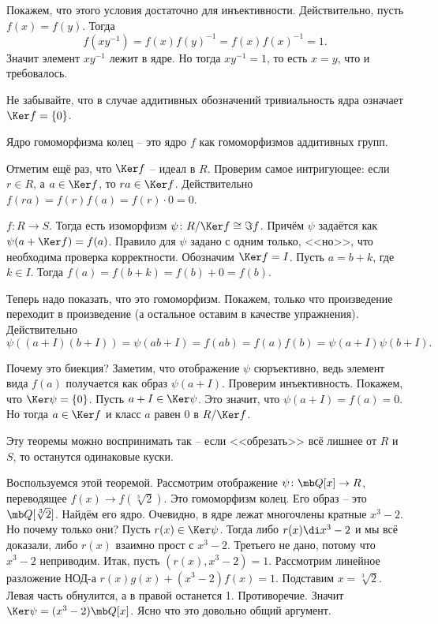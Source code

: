 Покажем, что этого условия достаточно для инъективности. Действительно, пусть $f(x)=f(y)$. Тогда $$f(xy^{-1})=f(x)f(y)^{-1}=f(x)f(x)^{-1}=1.$$
Значит элемент $xy^{-1}$ лежит в ядре. Но тогда $xy^{-1}=1$, то есть $x=y$, что и требовалось.
\endproof

\rm Не забывайте, что в случае аддитивных обозначений тривиальность ядра означает $\Ker f=\{0\}$.
\erm

\rm Ядро гомоморфизма колец -- это ядро $f$ как гомоморфизмов аддитивных групп.
\erm

\rm Отметим ещё раз, что $\Ker f$ -- идеал в $R$. Проверим самое интригующее: если $r\in R$, а $a\in \Ker f$, то $ra \in \Ker f$. Действительно $f(ra)=f(r)f(a)=f(r)\cdot 0=0$.
\erm 



 $f\colon R \to S$. Тогда есть изоморфизм $\psi \colon R/\Ker f \cong \Im f$. Причём $\psi$ задаётся как $\psi(a+\Ker f)=f(a)$. 
\ethrm
\proof Правило для $\psi$ задано с одним только, <<но>>, что необходима проверка корректности. Обозначим $\Ker f=I$. Пусть $a=b+k$, где $k\in I$. Тогда $f(a)=f(b+k)=f(b)+0=f(b)$.

Теперь надо показать, что это гомоморфизм. Покажем, только что произведение переходит в произведение (а остальное оставим в качестве упражнения). Действительно
$$\psi((a+I)(b+I))=\psi(ab+I)= f(ab)=f(a)f(b)=\psi(a+I)\psi(b+I).$$

Почему это биекция? Заметим, что отображение $\psi$ сюръективно, ведь элемент вида $f(a)$ получается как образ $\psi(a+I)$. Проверим инъективность. Покажем, что $\Ker \psi =\{0\}$. 
Пусть $a+I\in \Ker \psi$. Это значит, что $\psi(a+I)=f(a)=0$. Но тогда $a\in \Ker f$ и класс $a$ равен $0$ в $R/\Ker f$. 
\endproof

Эту теоремы можно воспринимать так -- если <<обрезать>> всё лишнее от $R$ и $S$, то останутся одинаковые куски.  

Воспользуемся этой теоремой. Рассмотрим отображение $\psi \colon \mb Q[x] \to R$, переводящее $f(x) \to f(\sqrt[3]{2})$. Это гомоморфизм колец. Его образ -- это $\mb Q[\sqrt[3]{2}]$. Найдём его ядро. Очевидно, в ядре лежат многочлены кратные $x^3-2$. Но почему только они? Пусть $r(x)\in \Ker \psi$. Тогда либо $r(x)\di x^3-2$ и мы всё доказали, либо $r(x)$ взаимно прост с $x^3-2$. Третьего не дано, потому что $x^3-2$ неприводим. Итак, пусть $(r(x),x^3-2)=1$. Рассмотрим линейное разложение НОД-а $r(x)g(x)+(x^3-2)f(x)=1$. Подставим $x=\sqrt[3]{2}$. Левая часть обнулится, а в правой останется 1. Противоречие. Значит $\Ker \psi = (x^3-2)\mb Q[x]$. Ясно что это довольно общий аргумент. 

